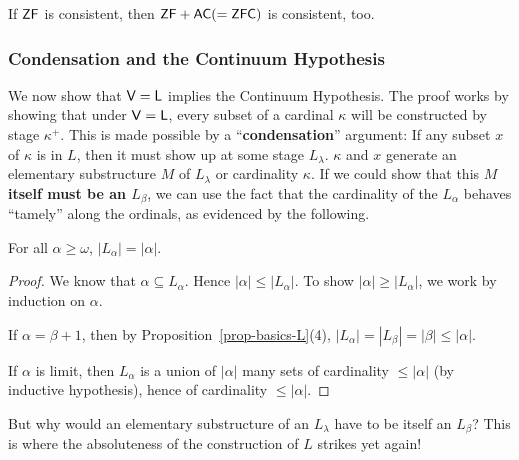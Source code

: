 \begin{corollary}\label{cor-con(ac)}If $\mathsf{ZF}$ is consistent, then $\mathsf{ZF}+\mathsf{AC} (= \mathsf{ZFC})$ is consistent, too.

\end{corollary}\subsubsection{Condensation and the Continuum Hypothesis}

We now show that $\mathsf{V=L}$ implies the Continuum Hypothesis. The proof works by showing that under $\mathsf{V=L}$, every subset of a cardinal $\kappa$ will be constructed by stage $\kappa^+$. This is made possible by a ``\textbf{condensation}'' argument: If any subset $x$ of $\kappa$ is in $L$, then it must show up at some stage $L_\lambda$. $\kappa$ and $x$ generate an elementary substructure $M$ of $L_\lambda$ or cardinality $\kappa$. If we could show that this \textbf{$M$ itself must be an $L_\beta$}, we can use the fact that the cardinality of the $L_\alpha$ behaves ``tamely'' along the ordinals, as evidenced by the following.

\begin{proposition}\label{prop-card-lalpha}For all $\alpha \geq \omega$, $|L_{\alpha}| = |\alpha|$.

\end{proposition}\begin{proof}We know that $\alpha \subseteq L_\alpha$. Hence $|\alpha| \leq |L_\alpha|$. To show $|\alpha| \geq |L_\alpha|$, we work by induction on $\alpha$.

If $\alpha = \beta +1$, then by Proposition~\ref{prop-basics-L}(4), $|L_\alpha| = |L_\beta| = |\beta| \leq |\alpha|$.

If $\alpha$ is limit, then $L_\alpha$ is a union of $|\alpha|$ many sets of cardinality $\leq |\alpha|$ (by inductive hypothesis), hence of cardinality $\leq |\alpha|$.

\end{proof}But why would an elementary substructure of an $L_\lambda$ have to be itself an $L_\beta$? This is where the absoluteness of the construction of $L$ strikes yet again!

